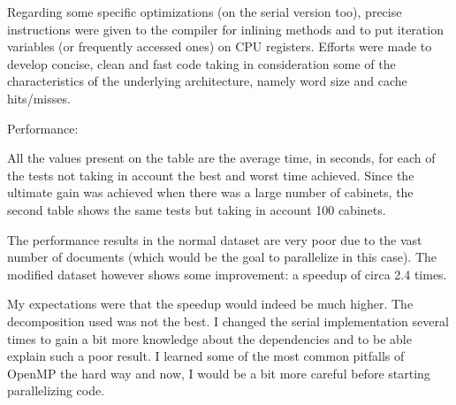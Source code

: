 \documentclass[times, 10pt,twocolumn]{article}
\begin{document}
	Regarding some specific optimizations (on the serial version too), precise instructions were given to the compiler for inlining methods and to put iteration variables (or frequently accessed ones) on CPU registers. Efforts were made to develop concise, clean and fast code taking in consideration some of the characteristics of the underlying architecture, namely word size and cache hits/misses.
 
Performance:

	All the values present on the table are the average time, in seconds, for each of the tests not taking in account the best and worst time achieved.
	Since the ultimate gain was achieved when there was a large number of cabinets, the second table shows the same tests but taking in account 100 cabinets.

	The performance results in the normal dataset are very poor due to the vast number of documents (which would be the goal to parallelize in this case). The modified dataset however shows some improvement: a speedup of circa 2.4 times.

	My expectations were that the speedup would indeed be much higher. The decomposition used was not the best. I changed the serial implementation several times to gain a bit more knowledge about the dependencies and to be able explain such a poor result. I learned some of the most common pitfalls of OpenMP the hard way and now, I would be a bit more careful before starting parallelizing code.
\end{document}
